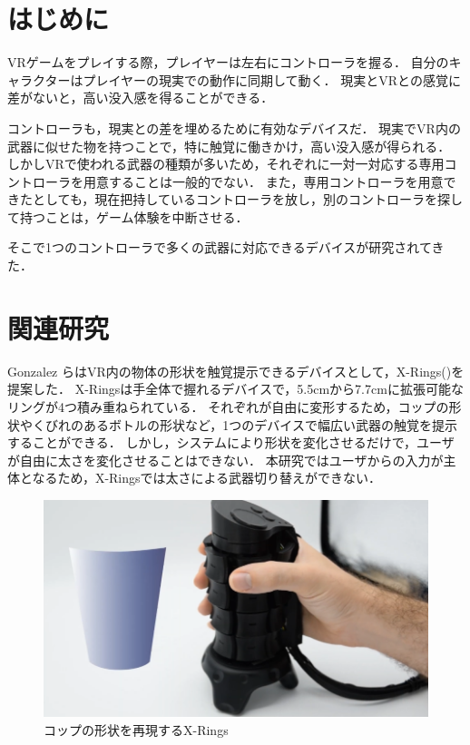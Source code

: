 \documentclass[uplatex]{jsarticle}
\begin{document}
\vspace{3mm}

\setcounter{page}{17}

\section{はじめに}

VRゲームをプレイする際，プレイヤーは左右にコントローラを握る．
自分のキャラクターはプレイヤーの現実での動作に同期して動く．
現実とVRとの感覚に差がないと，高い没入感を得ることができる．

コントローラも，現実との差を埋めるために有効なデバイスだ．
現実でVR内の武器に似せた物を持つことで，特に触覚に働きかけ，高い没入感が得られる．
しかしVRで使われる武器の種類が多いため，それぞれに一対一対応する専用コントローラを用意することは一般的でない．
また，専用コントローラを用意できたとしても，現在把持しているコントローラを放し，別のコントローラを探して持つことは，ゲーム体験を中断させる．

そこで1つのコントローラで多くの武器に対応できるデバイスが研究されてきた．


\section{関連研究}

Gonzalez らはVR内の物体の形状を触覚提示できるデバイスとして，X-Rings()を提案した\cite{gonzalez2021x-rings}．
X-Ringsは手全体で握れるデバイスで，5.5cmから7.7cmに拡張可能なリングが4つ積み重ねられている．
それぞれが自由に変形するため，コップの形状やくびれのあるボトルの形状など，1つのデバイスで幅広い武器の触覚を提示することができる．
しかし，システムにより形状を変化させるだけで，ユーザが自由に太さを変化させることはできない．
本研究ではユーザからの入力が主体となるため，X-Ringsでは太さによる武器切り替えができない．

\begin{figure}[htbp]
    \centering
    \includegraphics[width=0.9\linewidth]{fig/X-Rings.png}
    \caption{コップの形状を再現するX-Rings}
    \label{fig:X-Rings}
\end{figure}
\end{document}
